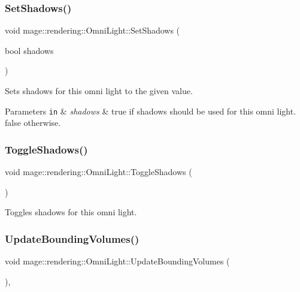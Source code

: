 \subsubsection{\texorpdfstring{Set\+Shadows()}{SetShadows()}}
{\footnotesize\ttfamily void mage\+::rendering\+::\+Omni\+Light\+::\+Set\+Shadows (\begin{DoxyParamCaption}\item[{bool}]{shadows }\end{DoxyParamCaption})\hspace{0.3cm}{\ttfamily [noexcept]}}

Sets shadows for this omni light to the given value.


\begin{DoxyParams}[1]{Parameters}
\mbox{\tt in}  & {\em shadows} & {\ttfamily true} if shadows should be used for this omni light. {\ttfamily false} otherwise. \\
\hline
\end{DoxyParams}
\mbox{\label{classmage_1_1rendering_1_1_omni_light_aa1816fad8913711c10994b66103279a2}} 
\subsubsection{\texorpdfstring{Toggle\+Shadows()}{ToggleShadows()}}
{\footnotesize\ttfamily void mage\+::rendering\+::\+Omni\+Light\+::\+Toggle\+Shadows (\begin{DoxyParamCaption}{ }\end{DoxyParamCaption})\hspace{0.3cm}{\ttfamily [noexcept]}}

Toggles shadows for this omni light. \mbox{\label{classmage_1_1rendering_1_1_omni_light_a44c6dee7d24c879aab0284ac21910337}} 
\subsubsection{\texorpdfstring{Update\+Bounding\+Volumes()}{UpdateBoundingVolumes()}}
{\footnotesize\ttfamily void mage\+::rendering\+::\+Omni\+Light\+::\+Update\+Bounding\+Volumes (\begin{DoxyParamCaption}{ }\end{DoxyParamCaption})\hspace{0.3cm}{\ttfamily [private]}, {\ttfamily [noexcept]}}

